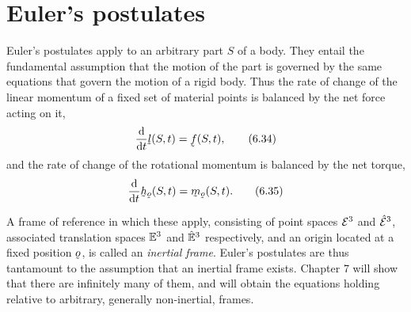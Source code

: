 \section{Euler's postulates}\label{sec:ch6euler}

Euler's postulates apply to an arbitrary part $S$ of a body. They
entail the fundamental assumption that the motion of the part is
governed by the same equations that govern the motion of a rigid body.
Thus the rate of change of the linear momentum of a fixed set of
material points is balanced by the net force acting on it,
\begin{equation}
   \frac{\dl}{\dl t}\vek{l}(S,t)=\vek{f}(S,t),
   \tag{6.34}\label{eq:6.34}
\end{equation}
and the rate of change of the rotational momentum is balanced by the
net torque,
\begin{equation}
   \frac{\dl}{\dl t}\bh_{\bo}(S,t)=\bm_{\bo}(S,t).
   \tag{6.35}\label{eq:6.35}
\end{equation}

A frame of reference in which these apply, consisting of point spaces
$\mathcal{E}^{3}$ and $\hat{\mathcal{E}}^{3}$, associated translation spaces $\mathbb{E}^{3}$ and $\hat{\mathbb{E}}^{3}$
respectively, and an origin located at a fixed position $\bo$, is
called an \emph{inertial frame}. Euler's postulates are thus tantamount
to the assumption that an inertial frame exists. Chapter 7 will show
that there are infinitely many of them, and will obtain the equations
holding relative to arbitrary, generally non-inertial, frames.

